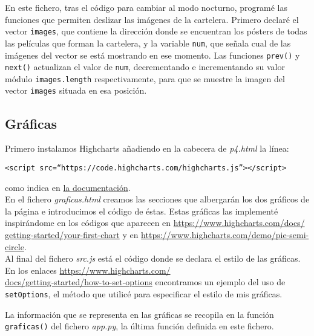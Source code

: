 \documentclass{article}
\begin{document}
En este fichero, tras el código para cambiar al modo nocturno, programé las funciones que permiten deslizar las imágenes de la cartelera. Primero declaré el vector \texttt{images}, que contiene la dirección donde se encuentran los pósters de todas las películas que forman la cartelera, y la variable \texttt{num}, que señala cual de las imágenes del vector se está mostrando en ese momento. Las funciones \texttt{prev()} y \texttt{next()} actualizan el valor de \texttt{num}, decrementando e incrementando su valor módulo \texttt{images.length} respectivamente, para que se muestre la imagen del vector \texttt{images} situada en esa posición.

\subsection{Gráficas}

Primero instalamos Highcharts añadiendo en la cabecera de \textit{p4.html} la línea:
\vspace{-1mm}
\begin{center}
  \texttt{<script src=``https://code.highcharts.com/highcharts.js''></script>}
\end{center}

como indica en \href{https://www.highcharts.com/docs/getting-started/installation}{la documentación}.\\

En el fichero \textit{graficas.html} creamos las secciones que albergarán los dos gráficos de la página e introducimos el código de éstas. Estas gráficas las implementé inspirándome en los códigos que aparecen en \href{https://www.highcharts.com/docs/getting-started/your-first-chart}{https://www.highcharts.com/docs/\\getting-started/your-first-chart} y en \href{https://www.highcharts.com/demo/pie-semi-circle}{https://www.highcharts.com/demo/pie-semi-circle}.\\

Al final del fichero \textit{src.js} está el código donde se declara el estilo de las gráficas. En los enlaces \href{https://www.highcharts.com/docs/getting-started/how-to-set-options}{https://www.highcharts.com/\\docs/getting-started/how-to-set-options} encontramos un ejemplo del uso de \texttt{setOptions}, el método que utilicé para especificar el estilo de mis gráficas.

La información que se representa en las gráficas se recopila en la función \texttt{graficas()} del fichero \textit{app.py}, la última función definida en este fichero.
\end{document}
